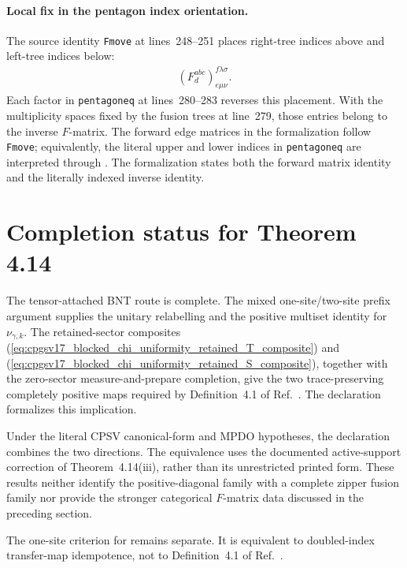 \documentclass{article}
\begin{document}
\paragraph{Local fix in the pentagon index orientation.}

The source identity \texttt{Fmove} at lines~248--251 places right-tree indices
above and left-tree indices below:
\begin{align}
    \left(F^{abc}_{d}\right)^{f\lambda\sigma}_{e\mu\nu}.
\label{eq:cpgsv17_blocked_chi_uniformity_printed_F_index_orientation}
\end{align}
Each factor in \texttt{pentagoneq} at lines~280--283 reverses this placement.
With the multiplicity spaces fixed by the fusion trees at line~279, those
entries belong to the inverse $F$-matrix. The forward edge matrices in the
formalization follow \texttt{Fmove}; equivalently, the literal upper and lower
indices in \texttt{pentagoneq} are interpreted through
. The
formalization states both the forward matrix identity and the literally
indexed inverse identity.

\section{Completion status for Theorem 4.14}

The tensor-attached BNT route is complete. The mixed one-site/two-site prefix
argument supplies the unitary relabelling and the positive multiset identity
for $\nu_{\gamma,k}$. The retained-sector composites
(\ref{eq:cpgsv17_blocked_chi_uniformity_retained_T_composite}) and
(\ref{eq:cpgsv17_blocked_chi_uniformity_retained_S_composite}), together with
the zero-sector measure-and-prepare completion, give the two trace-preserving
completely positive maps required by Definition~4.1 of
Ref.~\cite{Cirac2016MPDO_arXiv}. The declaration
 formalizes this
implication.

Under the literal CPSV canonical-form and MPDO hypotheses, the declaration
 combines the two
directions. The equivalence
 uses the documented
active-support correction of Theorem~4.14(iii), rather than its unrestricted
printed form. These results neither identify the positive-diagonal family with
a complete zipper fusion family nor provide the stronger categorical
$F$-matrix data discussed in the preceding section.

The one-site criterion for  remains
separate. It is equivalent to doubled-index transfer-map idempotence, not to
Definition~4.1 of Ref.~\cite{Cirac2016MPDO_arXiv}.



\end{document}
